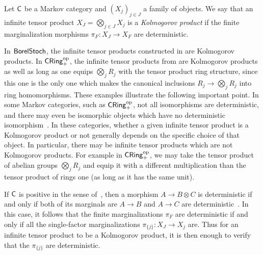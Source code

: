\documentclass[11pt]{article}
\begin{document}
\begin{definition}
    \label{defn_kolmogorov_ext}
    Let $\mathsf{C}$ be a Markov category and $(X_j)_{j \in J}$ a family of objects. We say that an infinite tensor product $X_J = \bigotimes_{j \in J} X_j$ is a \emph{Kolmogorov product} if the finite marginalization morphisms $\pi_F : X_J \to X_F$ are deterministic.
\end{definition}

In $\operatorname{\mathsf{BorelStoch}}$, the infinite tensor products constructed in  are Kolmogorov products. In $\operatorname{\mathsf{CRing}}_+^{\mathrm{op}}$, the infinite tensor products from  are Kolmogorov products as well as long as one equips $\bigotimes_j R_j$ with the tensor product ring structure, since this one is the only one which makes the canonical inclusions $R_j \to \bigotimes_j R_j$ into ring homomorphisms. These examples illustrate the following important point. In some Markov categories, such as $\operatorname{\mathsf{CRing}}_+^{\mathrm{op}}$, not all isomorphisms are deterministic, and there may even be isomorphic objects which have no deterministic isomorphism~\cite[Remark~10.9]{markov_cats}. In these categories, whether a given infinite tensor product is a Kolmogorov product or not generally depends on the specific choice of that object. In particular, there may be infinite tensor products which are not Kolmogorov products. For example in $\operatorname{\mathsf{CRing}}_+^{\mathrm{op}}$, we may take the tensor product of abelian groups $\bigotimes_j R_j$ and equip it with a different multiplication than the tensor product of rings one (as long as it has the same unit).

\begin{remark}
	If $\mathsf{C}$ is positive in the sense of~\cite[Definition~11.22]{markov_cats}, then a morphism $A \to B \otimes C$ is deterministic if and only if both of its marginals are $A \to B$ and $A \to C$ are deterministic~\cite[Corollary~12.15]{markov_cats}. In this case, it follows that the finite marginalizations $\pi_F$ are deterministic if and only if all the single-factor marginalizations $\pi_{\{j\}} : X_J \to X_j$ are. Thus for an infinite tensor product to be a Kolmogorov product, it is then enough to verify that the $\pi_{\{j\}}$ are deterministic.
\end{remark}
\end{document}
